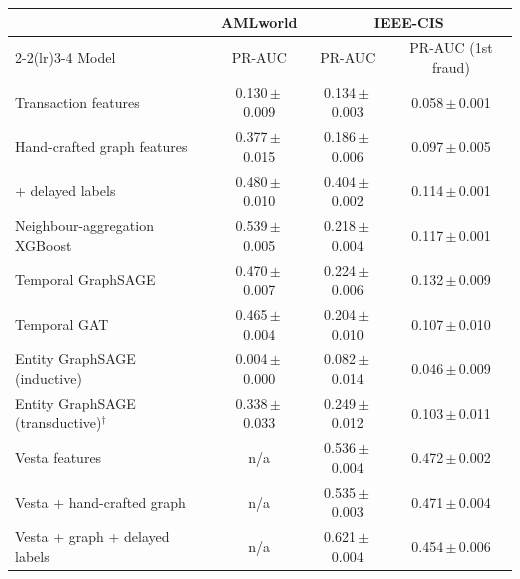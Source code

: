\begin{tabular}{@{}lccc@{}}
\toprule
 & AMLworld & \multicolumn{2}{c}{IEEE-CIS} \\
\cmidrule(lr){2-2}\cmidrule(lr){3-4}
Model & PR-AUC & PR-AUC & PR-AUC (1st fraud) \\
\midrule
Transaction features & 0.130\,$\pm$\,0.009 & 0.134\,$\pm$\,0.003 & 0.058\,$\pm$\,0.001 \\
Hand-crafted graph features & 0.377\,$\pm$\,0.015 & 0.186\,$\pm$\,0.006 & 0.097\,$\pm$\,0.005 \\
\quad + delayed labels & 0.480\,$\pm$\,0.010 & 0.404\,$\pm$\,0.002 & 0.114\,$\pm$\,0.001 \\
Neighbour-aggregation XGBoost & 0.539\,$\pm$\,0.005 & 0.218\,$\pm$\,0.004 & 0.117\,$\pm$\,0.001 \\
Temporal GraphSAGE & 0.470\,$\pm$\,0.007 & 0.224\,$\pm$\,0.006 & 0.132\,$\pm$\,0.009 \\
Temporal GAT & 0.465\,$\pm$\,0.004 & 0.204\,$\pm$\,0.010 & 0.107\,$\pm$\,0.010 \\
\midrule
Entity GraphSAGE (inductive) & 0.004\,$\pm$\,0.000 & 0.082\,$\pm$\,0.014 & 0.046\,$\pm$\,0.009 \\
Entity GraphSAGE (transductive)$^\dagger$ & 0.338\,$\pm$\,0.033 & 0.249\,$\pm$\,0.012 & 0.103\,$\pm$\,0.011 \\
\midrule
Vesta features & n/a & 0.536\,$\pm$\,0.004 & 0.472\,$\pm$\,0.002 \\
Vesta + hand-crafted graph & n/a & 0.535\,$\pm$\,0.003 & 0.471\,$\pm$\,0.004 \\
Vesta + graph + delayed labels & n/a & 0.621\,$\pm$\,0.004 & 0.454\,$\pm$\,0.006 \\
\bottomrule
\end{tabular}
